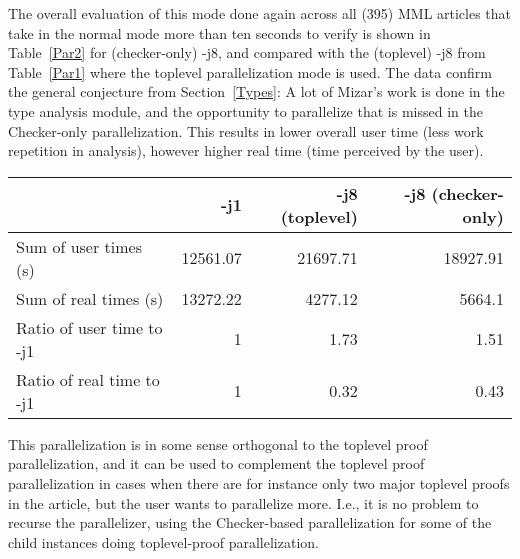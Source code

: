 \documentclass{llncs}
\begin{document}
The overall evaluation of this mode done again across all (395) MML
articles that take in the normal mode more than ten seconds to verify
is shown in Table~\ref{Par2} for (checker-only) -j8, and compared with the (toplevel) -j8 from
Table~\ref{Par1} where the toplevel parallelization mode is used. The
data confirm the general conjecture from Section~\ref{Types}: A lot of
Mizar's work is done in the type analysis module, and the opportunity to
parallelize that is missed in the Checker-only parallelization. This
results in lower overall user time (less work repetition in analysis), however higher real time (time perceived by
the user).
\vspace{-3mm}
\begin{table*}[htbp]
  \caption{Comparison of the toplevel and checker-only verification speeds on 395 slow MML articles run with one and eight parallel processes}
\begin{center}
  \begin{tabular}{|l|r|r|r|}
    \hline
    & -j1 & -j8 (toplevel) & -j8 (checker-only) \\
\hline
    Sum of user times (s)   & 12561.07 &  21697.71 & 18927.91 \\
\hline
    Sum of real times (s)   & 13272.22 &  4277.12 & 5664.1\\
\hline
    Ratio of user time to -j1 & 1 & 1.73 & 1.51 \\
\hline
    Ratio of real time to -j1  & 1 & 0.32 & 0.43 \\
    \hline    
  \end{tabular}
\end{center}
\label{Par2}
\end{table*}
\vspace{-8mm}
This parallelization is in some sense orthogonal to the toplevel proof
parallelization, and it can be used to complement the toplevel proof
parallelization in cases when there are for instance only two major
toplevel proofs in the article, but the user wants to parallelize
more. I.e., it is no problem to recurse the parallelizer, using the
Checker-based parallelization for some of the child instances doing
toplevel-proof parallelization.
\end{document}
